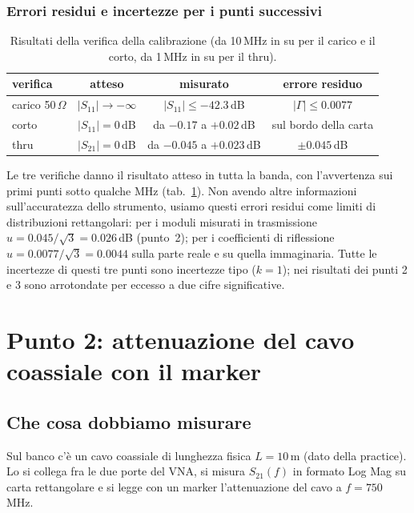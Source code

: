 \documentclass[11pt,a4paper,oneside]{book}
\begin{document}
\subsection{Errori residui e incertezze per i punti successivi}
\begin{table}[H]
\centering
\caption{Risultati della verifica della calibrazione (da 10\,MHz in su per il carico e il corto, da 1\,MHz in su per il thru).}
\label{tab:p1}
\begin{tabular}{l|c|c|c}
\hline
verifica & atteso & misurato & errore residuo \\ \hline
carico 50\,$\Omega$ & $|S_{11}|\to-\infty$ & $|S_{11}|\le-42.3$\,dB & $|\Gamma|\le0.0077$ \\
corto & $|S_{11}| = 0$\,dB & da $-0.17$ a $+0.02$\,dB & sul bordo della carta \\
thru & $|S_{21}| = 0$\,dB & da $-0.045$ a $+0.023$\,dB & $\pm0.045$\,dB \\ \hline
\end{tabular}
\end{table}
Le tre verifiche danno il risultato atteso in tutta la banda, con l'avvertenza sui primi punti sotto qualche MHz (tab.~\ref{tab:p1}). Non avendo altre informazioni sull'accuratezza dello strumento, usiamo questi errori residui come limiti di distribuzioni rettangolari: per i moduli misurati in trasmissione $u = 0.045/\sqrt3 = 0.026$\,dB (punto~2); per i coefficienti di riflessione $u = 0.0077/\sqrt3 = 0.0044$ sulla parte reale e su quella immaginaria. Tutte le incertezze di questi tre punti sono incertezze tipo ($k = 1$); nei risultati dei punti 2 e 3 sono arrotondate per eccesso a due cifre significative.

\chapter[Punto 2: attenuazione col marker]{Punto 2: attenuazione del cavo coassiale con il marker}

\section{Che cosa dobbiamo misurare}
Sul banco c'è un cavo coassiale di lunghezza fisica $L = 10$\,m (dato della practice). Lo si collega fra le due porte del VNA, si misura $S_{21}(f)$ in formato Log Mag su carta rettangolare e si legge con un marker l'attenuazione del cavo a $f = 750$\,MHz.
\end{document}
